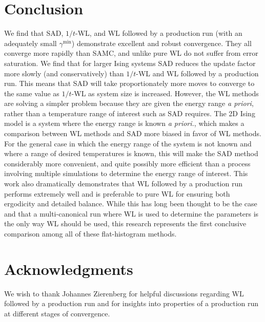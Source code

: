 \section{Conclusion}
We find that SAD, $1/t$-WL, and WL followed by a production run (with an
adequately small $\gamma^{\min}$) demonstrate excellent and robust
convergence. They all converge more rapidly than SAMC, and unlike pure
WL do not suffer from error saturation. We find that for larger Ising
systems SAD reduces the update factor more slowly (and conservatively)
than $1/t$-WL and WL followed by a production run. This means that SAD
will take proportionately more moves to converge to the same value as
$1/t$-WL as system size is increased.  However, the WL methods are
solving a simpler problem because they are given the energy range
\emph{a priori}, rather than a temperature range of interest such as
SAD requires.  The 2D Ising model is a system where the energy range
is known \emph{a priori.}, which makes a comparison between WL methods
and SAD more biased in favor of WL methods. For the general case in
which the energy range of the system is not known and where a range of
desired temperatures is known, this will make the SAD method
considerably more convenient, and quite possibly more efficient than a
process involving multiple simulations to determine the energy range
of interest. This work also dramatically demonstrates that WL followed
by a production run performs extremely well and is preferable to pure
WL for ensuring both ergodicity and detailed balance. While this has long
been thought to be the case and that a multi-canonical run where WL is used to
determine the parameters is the only way WL should be used, this research
represents the first conclusive comparison among all of these
flat-histogram methods.

\section{Acknowledgments}
We wish to thank Johannes Zierenberg for helpful discussions regarding WL followed by a production run and for insights into properties of a production run at different stages of convergence.

